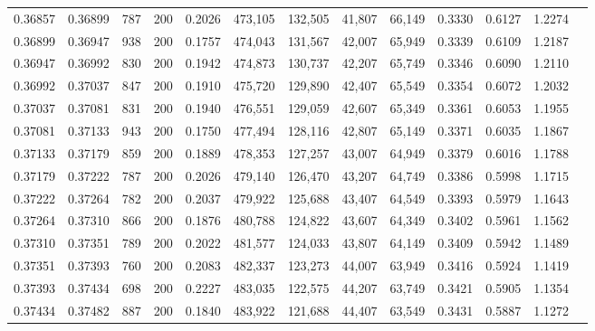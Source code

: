 \begin{tabular}{rrrrrrrrrrrrr}
0.36857 & 0.36899 &    787 & 200 &                                     0.2026 & 473,105 & 132,505 &  41,807 &  66,149 & 0.3330 & 0.6127 & 1.2274 \\
0.36899 & 0.36947 &    938 & 200 &                                     0.1757 & 474,043 & 131,567 &  42,007 &  65,949 & 0.3339 & 0.6109 & 1.2187 \\
0.36947 & 0.36992 &    830 & 200 &                                     0.1942 & 474,873 & 130,737 &  42,207 &  65,749 & 0.3346 & 0.6090 & 1.2110 \\
0.36992 & 0.37037 &    847 & 200 &                                     0.1910 & 475,720 & 129,890 &  42,407 &  65,549 & 0.3354 & 0.6072 & 1.2032 \\
0.37037 & 0.37081 &    831 & 200 &                                     0.1940 & 476,551 & 129,059 &  42,607 &  65,349 & 0.3361 & 0.6053 & 1.1955 \\
0.37081 & 0.37133 &    943 & 200 &                                     0.1750 & 477,494 & 128,116 &  42,807 &  65,149 & 0.3371 & 0.6035 & 1.1867 \\
0.37133 & 0.37179 &    859 & 200 &                                     0.1889 & 478,353 & 127,257 &  43,007 &  64,949 & 0.3379 & 0.6016 & 1.1788 \\
0.37179 & 0.37222 &    787 & 200 &                                     0.2026 & 479,140 & 126,470 &  43,207 &  64,749 & 0.3386 & 0.5998 & 1.1715 \\
0.37222 & 0.37264 &    782 & 200 &                                     0.2037 & 479,922 & 125,688 &  43,407 &  64,549 & 0.3393 & 0.5979 & 1.1643 \\
0.37264 & 0.37310 &    866 & 200 &                                     0.1876 & 480,788 & 124,822 &  43,607 &  64,349 & 0.3402 & 0.5961 & 1.1562 \\
0.37310 & 0.37351 &    789 & 200 &                                     0.2022 & 481,577 & 124,033 &  43,807 &  64,149 & 0.3409 & 0.5942 & 1.1489 \\
0.37351 & 0.37393 &    760 & 200 &                                     0.2083 & 482,337 & 123,273 &  44,007 &  63,949 & 0.3416 & 0.5924 & 1.1419 \\
0.37393 & 0.37434 &    698 & 200 &                                     0.2227 & 483,035 & 122,575 &  44,207 &  63,749 & 0.3421 & 0.5905 & 1.1354 \\
0.37434 & 0.37482 &    887 & 200 &                                     0.1840 & 483,922 & 121,688 &  44,407 &  63,549 & 0.3431 & 0.5887 & 1.1272 \\

\end{tabular}
